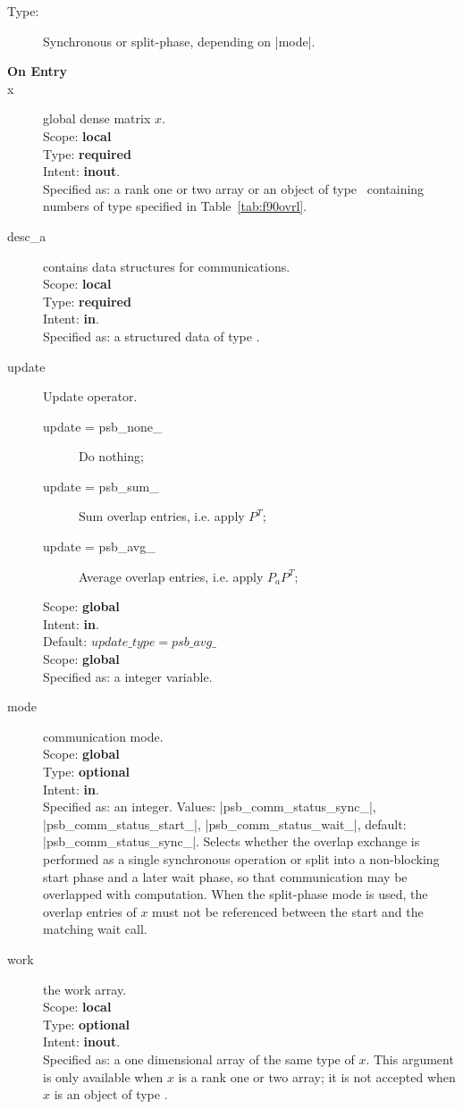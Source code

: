 \begin{description}
\item[Type:] Synchronous or split-phase, depending on \fortinline|mode|.
\item[\bf On Entry]
\item[x] global dense matrix $x$.\\
Scope: {\bf local} \\
Type: {\bf required} \\
Intent: {\bf inout}.\\
Specified as:  a rank one or two array or an object of type \vdata\ 
containing numbers of type specified in
Table~\ref{tab:f90ovrl}.
\item[desc\_a] contains data structures for communications.\\
Scope: {\bf local} \\
Type: {\bf required}\\
Intent: {\bf in}.\\
Specified as: a structured data of type \descdata.
\item[update] Update operator. \\
\begin{description}
\item[update = psb\_none\_] Do nothing;
\item[update = psb\_sum\_] Sum overlap entries, i.e. apply $P^T$;
\item[update = psb\_avg\_] Average overlap entries, i.e. apply $P_aP^T$;
\end{description}
Scope: {\bf global} \\
Intent: {\bf in}.\\
Default: $update\_type = psb\_avg\_ $\\
Scope: {\bf global} \\
Specified as: a integer variable.
\item[mode] communication mode.\\
Scope: {\bf global} \\
Type: {\bf optional} \\
Intent: {\bf in}.\\
Specified as: an integer. Values: \fortinline|psb_comm_status_sync_|,
\fortinline|psb_comm_status_start_|, \fortinline|psb_comm_status_wait_|, default:
\fortinline|psb_comm_status_sync_|. Selects whether the overlap exchange
is performed as a single synchronous operation or split into a
non-blocking start phase and a later wait phase, so that communication
may be overlapped with computation. When the split-phase mode is used,
the overlap entries of $x$ must not be referenced between the start and
the matching wait call.
\item[work] the work array. \\
Scope: {\bf local} \\
Type: {\bf optional}\\
Intent: {\bf inout}.\\
Specified as: a one dimensional array of the same type of $x$. This
argument is only available when $x$ is a rank one or two array; it is
not accepted when $x$ is an object of type \vdata.


\end{description}
